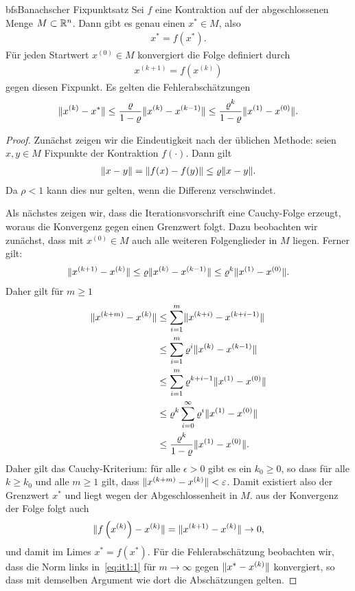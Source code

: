 \begin{Satz*}{bfs}{Banachscher Fixpunktsatz}
  Sei $f$ eine Kontraktion auf der abgeschlossenen Menge
  $M\subset\mathbb R^n$. Dann gibt es genau einen  $x^*\in M$,
  also
  \begin{gather}
    x^* = f(x^*).
  \end{gather}
  Für jeden Startwert $x^{(0)}\in M$ konvergiert die Folge definiert durch
  \begin{gather}
    x^{(k+1)} = f\left(x^{(k)}\right)
  \end{gather}
  gegen diesen Fixpunkt. Es gelten die Fehlerabschätzungen
  \begin{gather}
    \lVert x^{(k)}-x^*\rVert
    \le \frac{\varrho}{1-\varrho}\lVert x^{(k)}-x^{(k-1)}\rVert
    \le \frac{\varrho^k}{1-\varrho}\lVert x^{(1)}-x^{(0)}\rVert.
  \end{gather}
\end{Satz*}

\begin{proof}
  Zunächst zeigen wir die Eindeutigkeit nach der üblichen Methode:
  seien $x,y\in M$ Fixpunkte der Kontraktion $f(\cdot)$. Dann gilt
  \begin{gather}
    \lVert x-y\rVert = \lVert f(x)-f(y)\rVert \le \varrho \lVert x-y\rVert.
  \end{gather}
  Da $\rho<1$ kann dies nur gelten, wenn die Differenz verschwindet.

  Als nächstes zeigen wir, dass die Iterationsvorschrift eine
  Cauchy-Folge erzeugt, woraus die Konvergenz gegen einen Grenzwert
  folgt. Dazu beobachten wir zunächst, dass mit $x^{(0)}\in M$ auch
  alle weiteren Folgenglieder in $M$ liegen. Ferner gilt:
  \begin{gather}
    \lVert x^{(k+1)}-x^{(k)}\rVert \le \varrho \lVert x^{(k)}-x^{(k-1)}\rVert
    \le \varrho^k\lVert x^{(1)}-x^{(0)}\rVert.
  \end{gather}
  Daher gilt für $m\ge 1$
  \begin{align}
    \label{eq:it1:1}
    \lVert x^{(k+m)}-x^{(k)}\rVert
    &\le \sum_{i=1}^m \lVert x^{(k+i)}-x^{(k+i-1)}\rVert\\
    & \le \sum_{i=1}^m \varrho^{i} \lVert x^{(k)}-x^{(k-1)}\rVert\\
    & \le \sum_{i=1}^m \varrho^{k+i-1} \lVert x^{(1)}-x^{(0)}\rVert\\
    & \le \varrho^k \sum_{i=0}^\infty \varrho^i \lVert x^{(1)}-x^{(0)}\rVert\\
    & \le \frac{\varrho^k}{1-\varrho} \lVert x^{(1)}-x^{(0)}\rVert. 
  \end{align}
  Daher gilt das Cauchy-Kriterium: für alle $\epsilon>0$ gibt es ein
  $k_0\ge 0$, so dass für alle $k\ge k_0$ und alle $m\ge 1$ gilt, dass
  $\lVert x^{(k+m)}-x^{(k)}\rVert < \varepsilon$. Damit existiert also der
  Grenzwert $x^*$ und liegt wegen der Abgeschlossenheit in $M$. aus
  der Konvergenz der Folge folgt auch
  \begin{gather}
    \lVert f\left(x^{(k)}\right)-x^{(k)}\rVert = \lVert x^{(k+1)}-x^{(k)}\rVert
    \to 0,
  \end{gather}
  und damit im Limes $x^* = f(x^*)$. Für die Fehlerabschätzung
  beobachten wir, dass die Norm links in~\eqref{eq:it1:1} für
  $m\to\infty$ gegen $\lVert x^*-x^{(k)}\rVert$ konvergiert, so dass mit
  demselben Argument wie dort die Abschätzungen gelten.
\end{proof}

